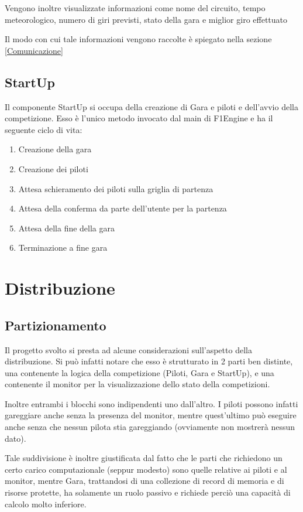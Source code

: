 \documentclass[a4paper,11pt, twoside, openright]{book}
\begin{document}
      Vengono inoltre visualizzate informazioni come nome del circuito, tempo meteorologico, numero di giri previsti,
      stato della gara e miglior giro effettuato

      Il modo con cui tale informazioni vengono raccolte è spiegato nella sezione \ref{Comunicazione}
    
    \section{StartUp}
      Il componente StartUp si occupa della creazione di Gara e piloti e dell'avvio della competizione.
      Esso è l'unico metodo invocato dal main di F1Engine e ha il seguente ciclo di vita:
      
      \begin{enumerate}
	\item Creazione della gara
	\item Creazione dei piloti
	\item Attesa schieramento dei piloti sulla griglia di partenza
	\item Attesa della conferma da parte dell'utente per la partenza
	\item Attesa della fine della gara
	\item Terminazione a fine gara
      \end{enumerate}
      
  \chapter{Distribuzione}
    \section{Partizionamento}
      Il progetto svolto si presta ad alcune considerazioni sull'aspetto della distribuzione. 
      Si può infatti notare che esso è strutturato in 2 parti ben distinte, una contenente la logica della
      competizione (Piloti, Gara e StartUp), e una contenente il monitor per la visualizzazione dello
      stato della competizioni.
      
      Inoltre entrambi i blocchi sono indipendenti uno dall'altro. I piloti possono infatti
      gareggiare anche senza la presenza del monitor, mentre quest'ultimo può eseguire anche senza che nessun pilota
      stia gareggiando (ovviamente non mostrerà nessun dato).
      
      Tale suddivisione è inoltre giustificata dal fatto che le parti che richiedono un certo carico computazionale 
      (seppur modesto) sono quelle relative ai piloti e al monitor, mentre
      Gara, trattandosi di una collezione di record di memoria e di risorse protette, ha solamente un ruolo passivo
      e richiede perciò una capacità di calcolo molto inferiore.
      
\end{document}
